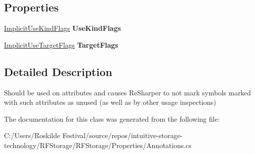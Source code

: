 \subsection*{Properties}
\begin{DoxyCompactItemize}
\item 
\mbox{\label{class_r_f_storage_1_1_means_implicit_use_attribute_af99f50e57dbf3cf8a9557fae7f397eef}} 
\mbox{\hyperlink{namespace_r_f_storage_a858608c6c632849e1730c5fafed9fa25}{Implicit\+Use\+Kind\+Flags}} {\bfseries Use\+Kind\+Flags}
\item 
\mbox{\label{class_r_f_storage_1_1_means_implicit_use_attribute_a6999fc2115bfeefa8b9d0a3aa321c6d3}} 
\mbox{\hyperlink{namespace_r_f_storage_a11267cbdad6c26a08cf6b5c281d2f67b}{Implicit\+Use\+Target\+Flags}} {\bfseries Target\+Flags}
\end{DoxyCompactItemize}


\subsection{Detailed Description}
Should be used on attributes and causes Re\+Sharper to not mark symbols marked with such attributes as unused (as well as by other usage inspections) 



The documentation for this class was generated from the following file\+:\begin{DoxyCompactItemize}
\item 
C\+:/\+Users/\+Roskilde Festival/source/repos/intuitive-\/storage-\/technology/\+R\+F\+Storage/\+R\+F\+Storage/\+Properties/Annotations.\+cs\end{DoxyCompactItemize}
